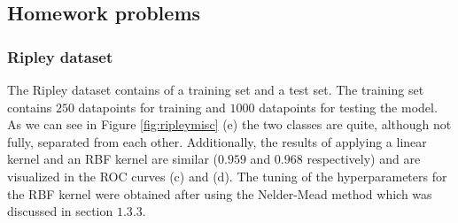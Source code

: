 \documentclass[a4paper, 11pt, one column]{article}
\begin{document}
\subsection{Homework problems}
\subsubsection{Ripley dataset}
The Ripley dataset contains of a training set and a test set. The training set contains $250$ datapoints for training and $1000$ datapoints for testing the model. As we can see in Figure \ref{fig:ripleymisc} (e) the two classes are quite, although not fully, separated from each other. Additionally, the results of applying a linear kernel and an RBF kernel are similar ($0.959$ and $0.968$ respectively) and are visualized in the ROC curves (c) and (d). The tuning of the hyperparameters for the RBF kernel were obtained after using the Nelder-Mead method which was discussed in section $1.3.3$.  
\end{document}
